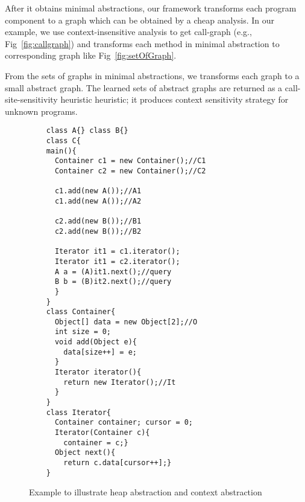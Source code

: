 After it obtains minimal abstractions, our framework transforms each program component to a graph which can be obtained by a cheap analysis.
In our example, we use context-insensitive analysis to get call-graph (e.g., Fig~\ref{fig:callgraph}) and transforms each method in minimal abstraction to corresponding graph like Fig~\ref{fig:setOfGraph}.


From the sets of graphs in minimal abstractions, we transforms each graph to a small abstract graph.
The learned sets of abstract graphs are returned as a call-site-sensitivity heuristic heuristic;
it produces context sensitivity strategy for unknown programs.



%

\begin{figure}
	\centering
	\begin{multicols}{2}
	\begin{lstlisting}
	class A{} class B{}
	class C{
	main(){
	  Container c1 = new Container();//C1
	  Container c2 = new Container();//C2
	
	  c1.add(new A());//A1
	  c1.add(new A());//A2
	  
	  c2.add(new B());//B1
	  c2.add(new B());//B2
	
	  Iterator it1 = c1.iterator();
	  Iterator it1 = c2.iterator();
	  A a = (A)it1.next();//query
	  B b = (B)it2.next();//query
	  }
	}
	class Container{
	  Object[] data = new Object[2];//O
	  int size = 0;
	  void add(Object e){
	    data[size++] = e;
	  }
	  Iterator iterator(){
	    return new Iterator();//It
	  } 
	}
	class Iterator{
	  Container container; cursor = 0;
	  Iterator(Container c){
	    container = c;}
	  Object next(){
	    return c.data[cursor++];}
	}
	\end{lstlisting}
	\end{multicols}
	\caption{Example to illustrate heap abstraction and context abstraction}
\end{figure}

